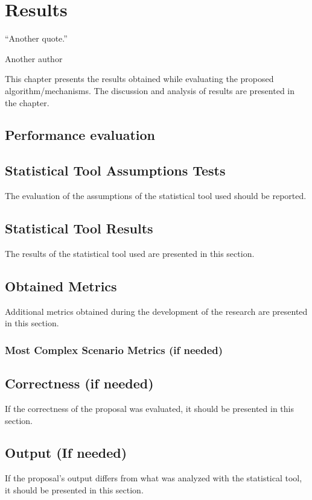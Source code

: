 \chapter{Results}
\epigraph{``Another quote.''}{\vspace{10pt}Another author}
\label{chapter:results}
\newpage

This chapter presents the results obtained while evaluating the proposed algorithm/mechanisms. The discussion and analysis of results are presented in the  chapter.


\section{Performance evaluation}
 
\section{Statistical Tool Assumptions Tests}
The evaluation of the assumptions of the statistical tool used should be reported.

\section{Statistical Tool Results}
The results of the statistical tool used are presented in this section.

\section{Obtained Metrics}
Additional metrics obtained during the development of the research are presented in this section. 


\subsection{Most Complex Scenario Metrics (if needed)}


\section{Correctness (if needed)}
If the correctness of the proposal was evaluated, it should be presented in this section.
\section{Output (If needed)}
If the proposal's output differs from what was analyzed with the statistical tool, it should be presented in this section.
\newpage
